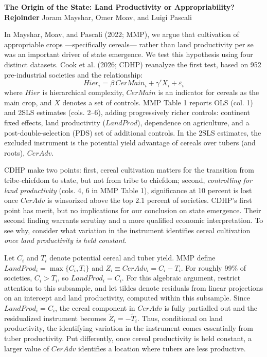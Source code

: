 \documentclass[11pt]{article}
\begin{document}
	\fontsize{10.5pt}{12.5pt}\selectfont
	\vspace*{-0.7in}
	
	\begin{center}
		
		{\normalsize\bfseries The Origin of the State: Land Productivity or Appropriability?\\			
			Rejoinder}
		\vspace{0.2em}
		{\normalsize Joram Mayshar, Omer Moav, and Luigi Pascali}
		
	\end{center}
	
	\vspace{0.4em}

In Mayshar, Moav, and Pascali (2022; MMP), we argue that cultivation of appropriable crops —specifically cereals— rather than land productivity per se was an important driver of state emergence. We test this hypothesis using four distinct datasets. Cook et al. (2026; CDHP) reanalyze the first test, based on 952 pre-industrial societies and the relationship:
\begin{equation}
	Hier_i = \beta\,CerMain_i + \gamma' X_i + \varepsilon_i
\end{equation}
where $Hier$ is hierarchical complexity, $CerMain$ is an indicator for cereals as the main crop, and $X$ denotes a set of controls. MMP Table 1 reports OLS (col. 1) and 2SLS estimates (cols. 2--6), adding progressively richer controls: continent fixed effects, land productivity ($LandProd$), dependence on agriculture, and a post-double-selection (PDS) set of additional controls. In the 2SLS estimates, the excluded instrument is the potential yield advantage of cereals over tubers (and roots), $CerAdv$. 

CDHP make two points: first, cereal cultivation matters for the transition from tribe-chiefdom to state, but not from tribe to chiefdom; second, \emph{controlling for land productivity} (cols. 4, 6 in MMP Table 1), significance at 10 percent is lost once $CerAdv$ is winsorized above the top 2.1 percent of societies. CDHP’s first point has merit, but no implications for our conclusion on state emergence. Their second finding warrants scrutiny and a more qualified economic interpretation. To see why, consider what variation in the instrument identifies cereal cultivation \emph{once land productivity is held constant}.

Let $C_i$ and $T_i$ denote potential cereal and tuber yield. MMP define $LandProd_i=\max\{C_i,T_i\}$ and $Z_i \equiv CerAdv_i = C_i-T_i$. For roughly 99\% of societies, $C_i>T_i$, so $LandProd_i=C_i$. For this algebraic argument, restrict attention to this subsample, and let tildes denote residuals from linear projections on an intercept and land productivity, computed within this subsample. Since $LandProd_i=C_i$, the cereal component in $CerAdv$ is fully partialled out and the residualized instrument becomes $\widetilde{Z}_i=-\widetilde{T}_i$. Thus, conditional on land productivity, the identifying variation in the instrument comes essentially from tuber productivity. Put differently, once cereal productivity is held constant, a larger value of $CerAdv$ identifies a location where tubers are less productive.
\end{document}

